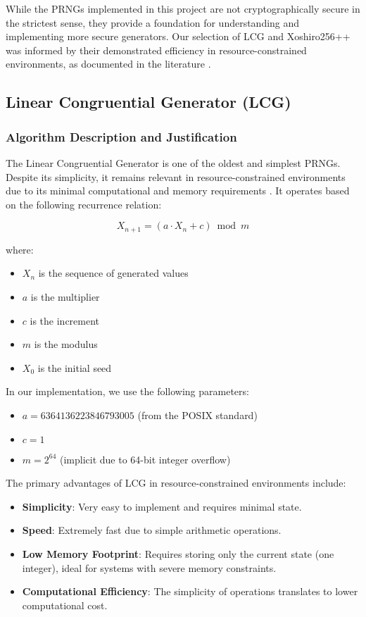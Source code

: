 While the PRNGs implemented in this project are not cryptographically secure in the strictest sense, they provide a foundation for understanding and implementing more secure generators. Our selection of LCG and Xoshiro256++ was informed by their demonstrated efficiency in resource-constrained environments, as documented in the literature \cite{prng_iot, xoshiro_website}.

\subsection{Linear Congruential Generator (LCG)}

\subsubsection{Algorithm Description and Justification}

The Linear Congruential Generator is one of the oldest and simplest PRNGs. Despite its simplicity, it remains relevant in resource-constrained environments due to its minimal computational and memory requirements \cite{prng_iot}. It operates based on the following recurrence relation:

\begin{equation}
X_{n+1} = (a \cdot X_n + c) \bmod m
\end{equation}

where:
\begin{itemize}
    \item $X_n$ is the sequence of generated values
    \item $a$ is the multiplier
    \item $c$ is the increment
    \item $m$ is the modulus
    \item $X_0$ is the initial seed
\end{itemize}

In our implementation, we use the following parameters:
\begin{itemize}
    \item $a = 6364136223846793005$ (from the POSIX standard)
    \item $c = 1$
    \item $m = 2^{64}$ (implicit due to 64-bit integer overflow)
\end{itemize}

The primary advantages of LCG in resource-constrained environments include:

\begin{itemize}
    \item \textbf{Simplicity}: Very easy to implement and requires minimal state.
    \item \textbf{Speed}: Extremely fast due to simple arithmetic operations.
    \item \textbf{Low Memory Footprint}: Requires storing only the current state (one integer), ideal for systems with severe memory constraints.
    \item \textbf{Computational Efficiency}: The simplicity of operations translates to lower computational cost.
\end{itemize}

